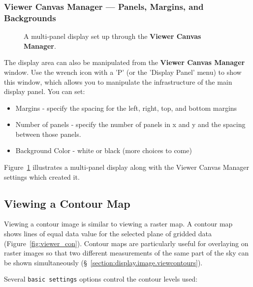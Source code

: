 \subsubsection{Viewer Canvas Manager --- Panels, Margins, and Backgrounds}
\label{section:display.viewerGUI.canvas.multi}

\begin{figure}[h!]
\begin{center}
\caption{\label{fig:viewer_canvas} A multi-panel display
set up through the {\bf Viewer Canvas Manager}.} 
\hrulefill
\end{center}
\end{figure}

The display area can also be manipulated from the {\bf Viewer Canvas Manager} window. Use 
the wrench icon with a 'P' (or the 'Display Panel' menu) to show this window, which allows
you to manipulate the infrastructure of the main display panel. You can set:

\begin{itemize}
   \item Margins - specify the spacing for the left, right, top, and bottom margins
   \item Number of panels - specify the number of panels in x and y
         and the spacing between those panels.
   \item Background Color - white or black (more choices to come)
\end{itemize}

Figure~\ref{fig:viewer_canvas} illustrates a multi-panel display along
with the Viewer Canvas Manager settings which created it. 

\subsection{Viewing a Contour Map}
\label{section:display.image.contour}

Viewing a contour image is similar to viewing a raster map. A contour map
shows lines of equal data value for the
selected plane of gridded data (Figure~\ref{fig:viewer_con}).
Contour maps are particularly useful for overlaying on raster images so
that two different measurements of the same part of the sky can be shown
simultaneously (\S~\ref{section:display.image.viewcontours}).

Several {\tt basic settings} options control the contour levels used:

